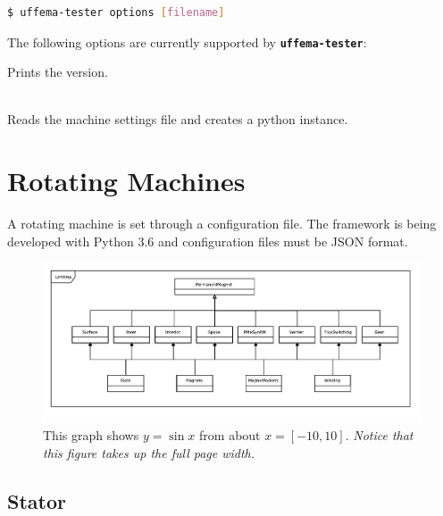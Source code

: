\documentclass{tufte-book} %
\begin{document}
\begin{lstlisting}[language=bash]
$ uffema-tester options [filename]
\end{lstlisting}

The following options are currently supported by \textbf{\texttt{uffema-tester}}:
 \begin{description}[leftmargin=1cm, style=nextline]
\item [{\normalfont\ttfamily{\textbf{-v}}}]  \hfil \newline Prints the version.
 \item [{\normalfont\ttfamily{\textbf{-f}}}]  {} \\ Reads the machine settings file and creates a python instance. 					
 \end{description}


\chapter{Rotating Machines}
\label{ch:1}

A rotating machine is set through a configuration file. The framework is being developed with Python 3.6 and configuration files must be JSON format. 

\begin{figure}[h]
\includegraphics[width=\linewidth]{PermanentMagnet.pdf}
\caption{This graph shows $y = \sin x$ from about $x = [-10, 10]$.
\emph{Notice that this figure takes up the full page width.}}
\label{fig:fullfig}
\end{figure}

\section{Stator}
\end{document}

